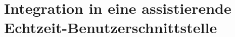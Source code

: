 

\chapter{Integration in eine assistierende Echtzeit-Benutzerschnittstelle} 

\label{cha:integration_in_eine_assistierende_echtzeit_benutzerschnittstelle}

